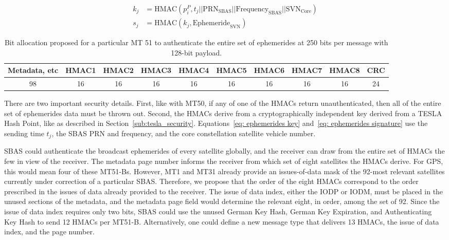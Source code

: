\documentclass[letterpaper,times]{IONconf/IONconf}
\begin{document}
		\begin{align}
			k_j &= \textrm{HMAC}(p^P_i, t_j || \textrm{PRN}_\textrm{SBAS} || \textrm{Frequency}_\textrm{SBAS} || \textrm{SVN}_\textrm{Core} \label{eq: ephemerides key}) \\
			s_j &= \textrm{HMAC}(k_j, \textrm{Ephemeride}_{\textrm{SVN}}) \label{eq: ephemerides signature}
		\end{align}

		\begin{table}
			\center
			\begin{tabular}{|c|c|c|c|c|c|c|c|c|c|} \hline
				Metadata, etc & HMAC1 & HMAC2 & HMAC3 & HMAC4 & HMAC5 & HMAC6 & HMAC7 & HMAC8 & CRC \\ \hline
				98 & 16 & 16 & 16 & 16& 16 & 16 & 16 & 16 & 24 \\ \hline
			\end{tabular}
			\caption{Bit allocation proposed for a particular MT 51 to authenticate the entire set of ephemerides at 250 bits per message with 128-bit payload.}
			\label{tab: nma}
		\end{table}

		There are two important security details.
		First, like with MT50, if any of one of the HMACs return unauthenticated, then all of the entire set of ephemerides data must be thrown out.
		Second, the HMACs derive from a cryptographically independent key derived from a TESLA Hash Point, like as described in Section~\ref{sub:tesla_security}.
		Equations~\eqref{eq: ephemerides key} and~\eqref{eq: ephemerides signature} use the sending time $t_j$, the SBAS PRN and frequency, and the core constellation satellite vehicle number.

		SBAS could authenticate the broadcast ephemerides of every satellite globally, and the receiver can draw from the entire set of HMACs the few in view of the receiver.
		The metadata page number informs the receiver from which set of eight satellites the HMACs derive.
		For GPS, this would mean four of these MT51-Bs.
		However, MT1 and MT31 already provide an issues-of-data mask of the 92-most relevant satellites currently under correction of a particular SBAS.
		Therefore, we propose that the order of the eight HMACs correspond to the order prescribed in the issues of data already provided to the receiver.
		The issue of data index, either the IODP or IODM, must be placed in the unused sections of the metadata, and the metadata page field would determine the relevant eight, in order, among the set of 92.
		Since the issue of data index requires only two bits, SBAS could use the unused German Key Hash, German Key Expiration, and Authenticating Key Hash to send 12 HMACs per MT51-B.
		Alternatively, one could define a new message type that delivers 13 HMACs, the issue of data index, and the page number.
\end{document}

